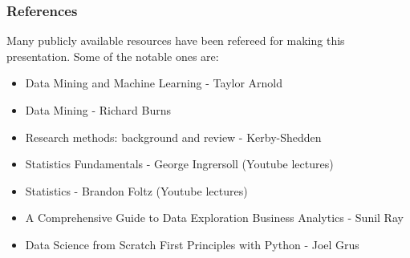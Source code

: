 
\begin{frame}\frametitle{References}

Many publicly available resources have been refereed for making this presentation. Some of the notable ones are:
\begin{itemize}
\item Data Mining and Machine Learning - Taylor Arnold
\item Data Mining - Richard Burns
\item Research methods: background and review - Kerby-Shedden
\item Statistics Fundamentals - George Ingrersoll (Youtube lectures)
\item Statistics - Brandon Foltz (Youtube lectures)
\item  A Comprehensive Guide to Data Exploration Business Analytics  - Sunil Ray
\item Data Science from Scratch First Principles with Python - Joel Grus
\end{itemize}


\end{frame}

